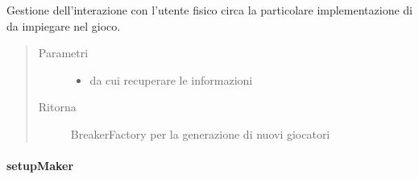 \documentclass[letterpaper,10pt,italian,openany,oneside]{sphinxmanual}
\begin{document}
\begin{fulllineitems}
\label{\detokenize{test/it/unicam/cs/pa/mastermind/ui/StartView:it.unicam.cs.pa.mastermind.ui.StartView.setupBreaker(BreakerFactoryRegistry)}}
Gestione dell’interazione con l’utente fisico circa la particolare implementazione di  da impiegare nel gioco.
\begin{quote}\begin{description}
\item[{Parametri}] \leavevmode\begin{itemize}
\item {} 
 \textendash{} da cui recuperare le informazioni

\end{itemize}

\item[{Ritorna}] \leavevmode
BreakerFactory per la generazione di nuovi giocatori 

\end{description}\end{quote}

\end{fulllineitems}



\paragraph{setupMaker}
\label{\detokenize{test/it/unicam/cs/pa/mastermind/ui/StartView:setupmaker}}
\end{document}
